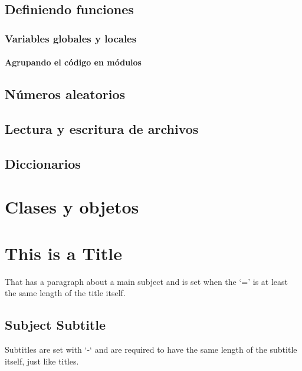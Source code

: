 \documentclass[a4paper,12pt,spanish]{sphinxmanual}
\begin{document}
\section{Definiendo funciones}
\label{Unidad04:definiendo-funciones}

\subsection{Variables globales y locales}
\label{Unidad04:variables-globales-y-locales}

\subsubsection{Agrupando el código en módulos}
\label{Unidad04:agrupando-el-codigo-en-modulos}

\section{Números aleatorios}
\label{Unidad04:numeros-aleatorios}

\section{Lectura y escritura de archivos}
\label{Unidad04:lectura-y-escritura-de-archivos}

\section{Diccionarios}
\label{Unidad04:diccionarios}

\chapter{Clases y objetos}
\label{Unidad05::doc}\label{Unidad05:clases-y-objetos}

\chapter{This is a Title}
\label{example::doc}\label{example:this-is-a-title}
That has a paragraph about a main subject and is set when the `='
is at least the same length of the title itself.


\section{Subject Subtitle}
\label{example:subject-subtitle}
Subtitles are set with `-` and are required to have the same length
of the subtitle itself, just like titles.
\end{document}
